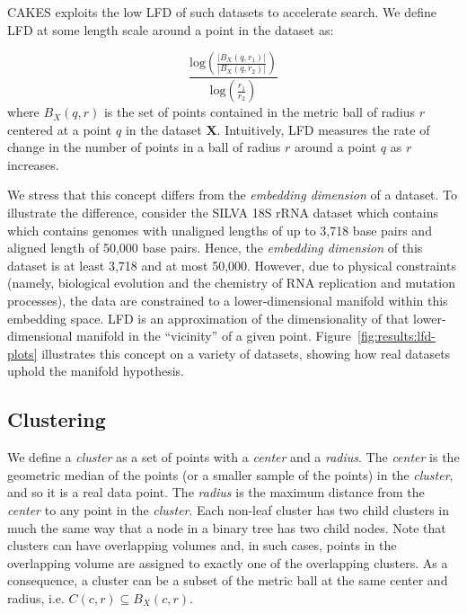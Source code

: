 CAKES exploits the low LFD of such datasets to accelerate search.
We define LFD at some length scale around a point in the dataset as:

\begin{equation}
    \frac{\text{log} \left( \frac{|B_X(q, r_1)|}{|B_X(q, r_2)|} \right) }{\text{log} \left( \frac{r_1}{r_2} \right) }
    \label{eq:methods:lfd-original}
\end{equation}
where $B_X(q, r)$ is the set of points contained in the metric ball of radius $r$ centered at a point $q$ in the dataset $\textbf{X}$.
Intuitively, LFD measures the rate of change in the number of points in a ball of radius $r$ around a point $q$ as $r$ increases.

We stress that this concept differs from the \textit{embedding dimension} of a dataset.
To illustrate the difference, consider the SILVA 18S rRNA dataset which contains which contains genomes with unaligned lengths of up to 3,718 base pairs and aligned length of 50,000 base pairs.
Hence, the \textit{embedding dimension} of this dataset is at least 3,718 and at most 50,000.
However, due to physical constraints (namely, biological evolution and the chemistry of RNA replication and mutation processes), the data are constrained to a lower-dimensional manifold within this embedding space.
LFD is an approximation of the dimensionality of that lower-dimensional manifold in the ``vicinity'' of a given point.
Figure~\ref{fig:results:lfd-plots} illustrates this concept on a variety of datasets, showing how real datasets uphold the manifold hypothesis.


\subsection{Clustering}
\label{sec:methods:clustering}

We define a \textit{cluster} as a set of points with a \textit{center} and a \textit{radius}.
The \textit{center} is the geometric median of the points (or a smaller sample of the points) in the \textit{cluster}, and so it is a real data point.
The \textit{radius} is the maximum distance from the \textit{center} to any point in the \textit{cluster}.
Each non-leaf cluster has two child clusters in much the same way that a node in a binary tree has two child nodes.
Note that clusters can have overlapping volumes and, in such cases, points in the overlapping volume are assigned to exactly one of the overlapping clusters.
As a consequence, a cluster can be a subset of the metric ball at the same center and radius, i.e. $C(c, r) \subseteq B_X(c, r)$.

